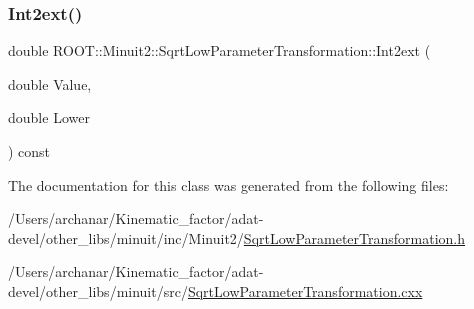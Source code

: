 \subsubsection{\texorpdfstring{Int2ext()}{Int2ext()}\hspace{0.1cm}{\footnotesize\ttfamily [3/3]}}
{\footnotesize\ttfamily double R\+O\+O\+T\+::\+Minuit2\+::\+Sqrt\+Low\+Parameter\+Transformation\+::\+Int2ext (\begin{DoxyParamCaption}\item[{double}]{Value,  }\item[{double}]{Lower }\end{DoxyParamCaption}) const}



The documentation for this class was generated from the following files\+:\begin{DoxyCompactItemize}
\item 
/\+Users/archanar/\+Kinematic\+\_\+factor/adat-\/devel/other\+\_\+libs/minuit/inc/\+Minuit2/\mbox{\hyperlink{adat-devel_2other__libs_2minuit_2inc_2Minuit2_2SqrtLowParameterTransformation_8h}{Sqrt\+Low\+Parameter\+Transformation.\+h}}\item 
/\+Users/archanar/\+Kinematic\+\_\+factor/adat-\/devel/other\+\_\+libs/minuit/src/\mbox{\hyperlink{adat-devel_2other__libs_2minuit_2src_2SqrtLowParameterTransformation_8cxx}{Sqrt\+Low\+Parameter\+Transformation.\+cxx}}\end{DoxyCompactItemize}
